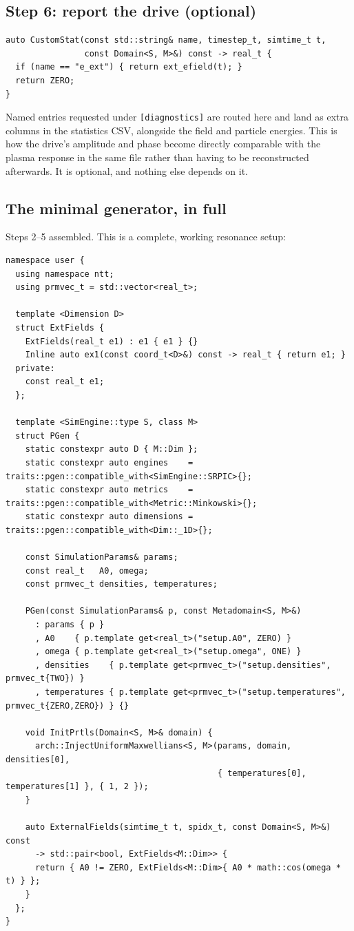 \documentclass[11pt,a4paper]{article}
\newcommand{\code}[1]{\texttt{\small #1}}
\begin{document}
\subsection{Step 6: report the drive (optional)}

\begin{lstlisting}
auto CustomStat(const std::string& name, timestep_t, simtime_t t,
                const Domain<S, M>&) const -> real_t {
  if (name == "e_ext") { return ext_efield(t); }
  return ZERO;
}
\end{lstlisting}

Named entries requested under \code{[diagnostics]} are routed here and land as extra
columns in the statistics CSV, alongside the field and particle energies. This is how
the drive's amplitude and phase become directly comparable with the plasma response in
the same file rather than having to be reconstructed afterwards. It is optional, and
nothing else depends on it.

\subsection{The minimal generator, in full}

Steps 2--5 assembled. This is a complete, working resonance setup:

\begin{lstlisting}
namespace user {
  using namespace ntt;
  using prmvec_t = std::vector<real_t>;

  template <Dimension D>
  struct ExtFields {
    ExtFields(real_t e1) : e1 { e1 } {}
    Inline auto ex1(const coord_t<D>&) const -> real_t { return e1; }
  private:
    const real_t e1;
  };

  template <SimEngine::type S, class M>
  struct PGen {
    static constexpr auto D { M::Dim };
    static constexpr auto engines    = traits::pgen::compatible_with<SimEngine::SRPIC>{};
    static constexpr auto metrics    = traits::pgen::compatible_with<Metric::Minkowski>{};
    static constexpr auto dimensions = traits::pgen::compatible_with<Dim::_1D>{};

    const SimulationParams& params;
    const real_t   A0, omega;
    const prmvec_t densities, temperatures;

    PGen(const SimulationParams& p, const Metadomain<S, M>&)
      : params { p }
      , A0    { p.template get<real_t>("setup.A0", ZERO) }
      , omega { p.template get<real_t>("setup.omega", ONE) }
      , densities    { p.template get<prmvec_t>("setup.densities",    prmvec_t{TWO}) }
      , temperatures { p.template get<prmvec_t>("setup.temperatures", prmvec_t{ZERO,ZERO}) } {}

    void InitPrtls(Domain<S, M>& domain) {
      arch::InjectUniformMaxwellians<S, M>(params, domain, densities[0],
                                           { temperatures[0], temperatures[1] }, { 1, 2 });
    }

    auto ExternalFields(simtime_t t, spidx_t, const Domain<S, M>&) const
      -> std::pair<bool, ExtFields<M::Dim>> {
      return { A0 != ZERO, ExtFields<M::Dim>{ A0 * math::cos(omega * t) } };
    }
  };
}
\end{lstlisting}
\end{document}
